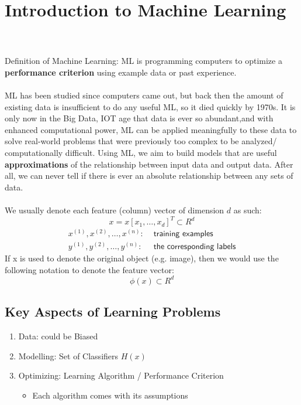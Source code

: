 \documentclass[a4paper]{article}
\begin{document}
\section{Introduction to Machine Learning}
   \\
\\
\noindent Definition of Machine Learning: ML is programming computers to optimize a \textbf{performance criterion} using example data or past experience.\\
\\
ML has been studied since computers came out, but back then the amount of existing data is insufficient to do any useful ML, so it died quickly by 1970s. It is only now in the Big Data, IOT age that data is ever so abundant,and with enhanced computational power, ML can be applied meaningfully to these data to solve real-world problems that were previously too complex to be analyzed/ computationally difficult. Using ML, we aim to build models that are useful \textbf{approximations} of the relationship between input data and output data. After all, we can never tell if there is ever an absolute relationship between any sets of data.\\
\\
\noindent We usually denote each feature (column) vector of dimension $d$ as such:
$$ x = x[x_1,\ldots,x_d]^T \subset R^d $$
$$\begin{aligned}
x^{(1)}, x^{(2)},\ldots, x^{(n)}:& \textsf{ training examples} \\ y^{(1)},y^{(2)},\ldots,y^{(n)}:&\textsf{ the corresponding labels} \end{aligned} $$
\noindent If x is used to denote the original object (e.g. image), then we would use the following notation to denote the feature vector:
$$ \phi(x) \subset R^d $$
\subsection{Key Aspects of Learning Problems}
\begin{enumerate}
	\item Data: could be Biased
	\item Modelling: Set of Classifiers $H(x)$
	\item Optimizing: Learning Algorithm / Performance Criterion
	\begin{itemize}[label=$\circ$]
		\item Each algorithm comes with its assumptions
	\end{itemize}
\end{enumerate}
\newpage
\end{document}
